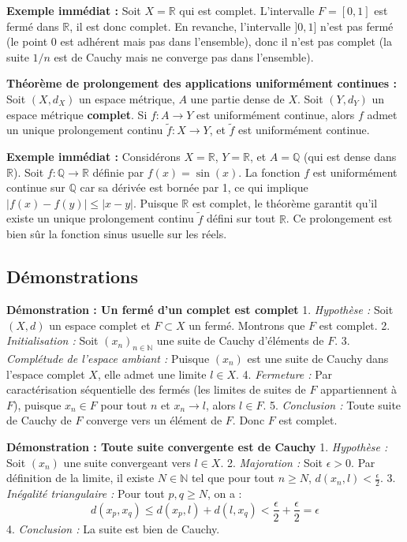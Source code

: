 \documentclass[11pt,a4paper]{article}
\begin{document}
\textbf{Exemple immédiat :}
Soit $X = \mathbb{R}$ qui est complet. L'intervalle $F = [0, 1]$ est fermé dans $\mathbb{R}$, il est donc complet. En revanche, l'intervalle $]0, 1]$ n'est pas fermé (le point $0$ est adhérent mais pas dans l'ensemble), donc il n'est pas complet (la suite $1/n$ est de Cauchy mais ne converge pas dans l'ensemble).

\textbf{Théorème de prolongement des applications uniformément continues :}
Soit $(X, d_X)$ un espace métrique, $A$ une partie dense de $X$. Soit $(Y, d_Y)$ un espace métrique \textbf{complet}. Si $f : A \to Y$ est uniformément continue, alors $f$ admet un unique prolongement continu $\tilde{f} : X \to Y$, et $\tilde{f}$ est uniformément continue.

\textbf{Exemple immédiat :}
Considérons $X = \mathbb{R}$, $Y = \mathbb{R}$, et $A = \mathbb{Q}$ (qui est dense dans $\mathbb{R}$). Soit $f : \mathbb{Q} \to \mathbb{R}$ définie par $f(x) = \sin(x)$. La fonction $f$ est uniformément continue sur $\mathbb{Q}$ car sa dérivée est bornée par 1, ce qui implique $|f(x) - f(y)| \le |x - y|$. Puisque $\mathbb{R}$ est complet, le théorème garantit qu'il existe un unique prolongement continu $\tilde{f}$ défini sur tout $\mathbb{R}$. Ce prolongement est bien sûr la fonction sinus usuelle sur les réels.

\subsection*{Démonstrations}

\textbf{Démonstration : Un fermé d'un complet est complet}
1. \textit{Hypothèse :} Soit $(X, d)$ un espace complet et $F \subset X$ un fermé. Montrons que $F$ est complet.
2. \textit{Initialisation :} Soit $(x_n)_{n \in \mathbb{N}}$ une suite de Cauchy d'éléments de $F$.
3. \textit{Complétude de l'espace ambiant :} Puisque $(x_n)$ est une suite de Cauchy dans l'espace complet $X$, elle admet une limite $l \in X$.
4. \textit{Fermeture :} Par caractérisation séquentielle des fermés (les limites de suites de $F$ appartiennent à $F$), puisque $x_n \in F$ pour tout $n$ et $x_n \to l$, alors $l \in F$.
5. \textit{Conclusion :} Toute suite de Cauchy de $F$ converge vers un élément de $F$. Donc $F$ est complet.

\textbf{Démonstration : Toute suite convergente est de Cauchy}
1. \textit{Hypothèse :} Soit $(x_n)$ une suite convergeant vers $l \in X$.
2. \textit{Majoration :} Soit $\epsilon > 0$. Par définition de la limite, il existe $N \in \mathbb{N}$ tel que pour tout $n \geq N$, $d(x_n, l) < \frac{\epsilon}{2}$.
3. \textit{Inégalité triangulaire :} Pour tout $p, q \geq N$, on a :
$$ d(x_p, x_q) \leq d(x_p, l) + d(l, x_q) < \frac{\epsilon}{2} + \frac{\epsilon}{2} = \epsilon $$
4. \textit{Conclusion :} La suite est bien de Cauchy.
\end{document}
